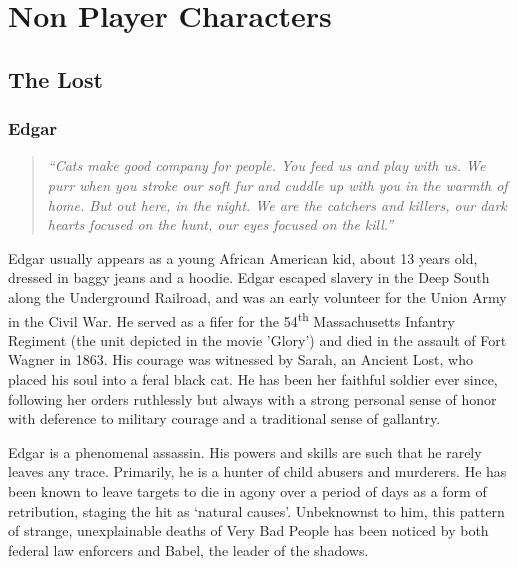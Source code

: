 \documentclass[letterpaper,serif]{rpg-module}
\begin{document}
\section{Non Player Characters}

\subsection{The Lost}

\subsubsection{Edgar}

\begin{quote}
\emph{``Cats make good company for people. You feed us and play with us. We purr when you stroke our soft fur and cuddle up with you in the warmth of home. But out here, in the night. We are the catchers and killers, our dark hearts focused on the hunt, our eyes focused on the kill.''}
\end{quote}
Edgar usually appears as a young African American kid, about 13 years old, dressed in baggy jeans and a hoodie. Edgar escaped slavery in the Deep South along the Underground Railroad, and was an early volunteer for the Union Army in the Civil War. He served as a fifer for the  54\textsuperscript{th} Massachusetts Infantry Regiment (the unit depicted in the movie 'Glory') and died in the assault of Fort Wagner in 1863. His courage was witnessed by Sarah, an Ancient Lost, who placed his soul into a feral black cat. He has been her faithful soldier ever since, following her orders ruthlessly but always with a strong personal sense of honor with deference to military courage and a traditional sense of gallantry.  

Edgar is a phenomenal assassin. His powers and skills are such that he rarely leaves any trace. Primarily, he is a hunter of child abusers and murderers. He has been known to leave targets to die in agony over a period of days as a form of retribution, staging the hit as `natural causes'. Unbeknownst to him, this pattern of strange, unexplainable deaths of Very Bad People has been noticed by both federal law enforcers and Babel, the leader of the shadows.

\vspace{12pt}
\end{document}
